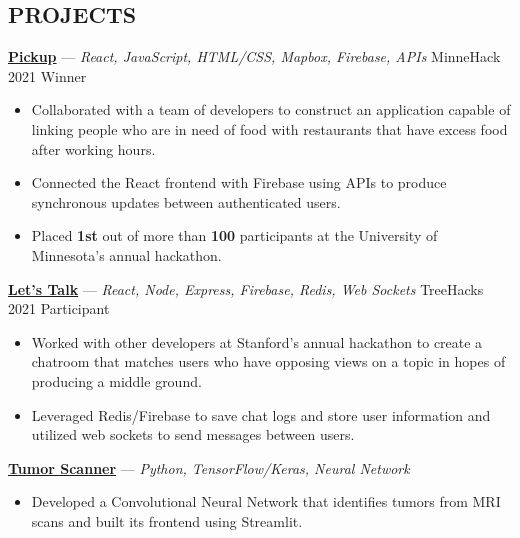 \documentclass[11pt]{res}
\begin{document}
\begin{footnotesize}
\begin{resume}
\begin{small}
\section{PROJECTS}
\end{small} 
\vspace{.5mm}
\href{https://devpost.com/software/pickup-7b8yhx}{\textbf{Pickup}} — {\sl React, JavaScript, HTML/CSS, Mapbox, Firebase, APIs} \hfill MinneHack 2021 Winner\vspace{-4.5mm}
\begin{itemize}[leftmargin=6.25mm] \itemsep -2pt 
\item Collaborated with a team of developers to construct an application capable of linking people who are in need of food with restaurants that have excess food after working hours.
\vspace{1.30mm}
\item Connected the React frontend with Firebase using APIs to produce synchronous updates between authenticated users.
\vspace{1.30mm}
\item Placed \textbf{1st} out of more than \textbf{100} participants at the University of Minnesota's annual hackathon. 
\end{itemize}
\vspace{-2.5mm}
\href{https://devpost.com/software/let-s-talk-7si84k}{\textbf{Let's Talk}} — {\sl React, Node, Express, Firebase, Redis, Web Sockets} \hfill TreeHacks 2021 Participant\vspace{-4.5mm}
\begin{itemize}[leftmargin=6.25mm] \itemsep -2pt 
\item Worked with other developers at Stanford's annual hackathon to create a chatroom that matches users who have opposing views on a topic in hopes of producing a middle ground. 
\vspace{1.30mm}
\item Leveraged Redis/Firebase to save chat logs and store user information and utilized web sockets to send messages between users. 
\end{itemize}
\vspace{-2.5mm}
\href{https://github.com/CharlesShi12/AI_Tumor_Scanner}{\textbf{Tumor Scanner}} — {\sl Python, TensorFlow/Keras, Neural Network}\vspace{-4.5mm}
\begin{itemize}[leftmargin=6.25mm] \itemsep -2pt 
\item Developed a Convolutional Neural Network that identifies tumors from MRI scans and built its frontend using Streamlit.

\end{itemize}
\end{resume}
\end{footnotesize}
\end{document}
